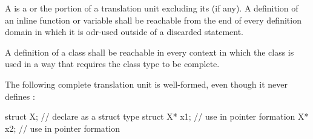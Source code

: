 \pnum
A  is
a  or
the portion of a translation unit
excluding its  (if any).
A definition of an inline function or variable shall be reachable
from the end of every definition domain
in which it is odr-used outside of a discarded statement.

\pnum
{}%
A definition of a class shall be reachable in every context in which
the class is used in a way that requires the class type to be complete.
\begin{example}
The following complete translation unit is well-formed,
even though it never defines :
\begin{codeblock}
struct X;                       // declare  as a struct type
struct X* x1;                   // use  in pointer formation
X* x2;                          // use  in pointer formation
\end{codeblock}
\end{example}

